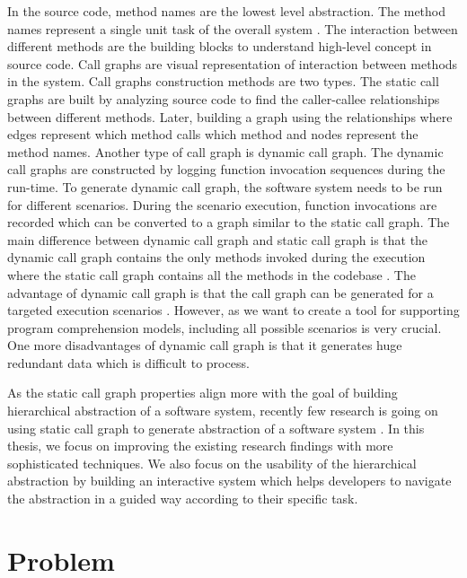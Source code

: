 In the source code, method names are the lowest level abstraction. The method names represent a single unit task of the overall system \cite{de2012using, starke2009searching}. The interaction between different methods are the building blocks to understand high-level concept in source code. Call graphs are visual representation of interaction between methods in the system. Call graphs construction methods are two types. The static call graphs are built by analyzing source code to find the caller-callee relationships between different methods. Later, building a graph using the relationships where edges represent which method calls which method and nodes represent the method names. Another type of call graph is dynamic call graph. The dynamic call graphs are constructed by logging function invocation sequences during the run-time. To generate dynamic call graph, the software system needs to be run for different scenarios. During the scenario execution, function invocations are recorded which can be converted to a graph similar to the static call graph. The main difference between dynamic call graph and static call graph is that the dynamic call graph contains the only methods invoked during the execution where the static call graph contains all the methods in the codebase \cite{gharibi2018automaticStaticCluster}. The advantage of dynamic call graph is that the call graph can be generated for a targeted execution scenarios \cite{feng2018hierarchicalExecutionComprehension}. However, as we want to create a tool for supporting program comprehension models, including all possible scenarios is very crucial. One more disadvantages of dynamic call graph is that it generates huge redundant data which is difficult to process. 

As the static call graph properties align more with the goal of building hierarchical abstraction of a software system, recently few research is going on using static call graph to generate abstraction of a software system \cite{gharibi2018automaticStaticCluster, walunj2019graphevoEvolutionCall}. In this thesis, we focus on improving the existing research findings with more sophisticated techniques. We also focus on the usability of the hierarchical abstraction by building an interactive system which helps developers to navigate the abstraction in a guided way according to their specific task. 

 
\newpage


\section{Problem }
\label{sec:problem}

